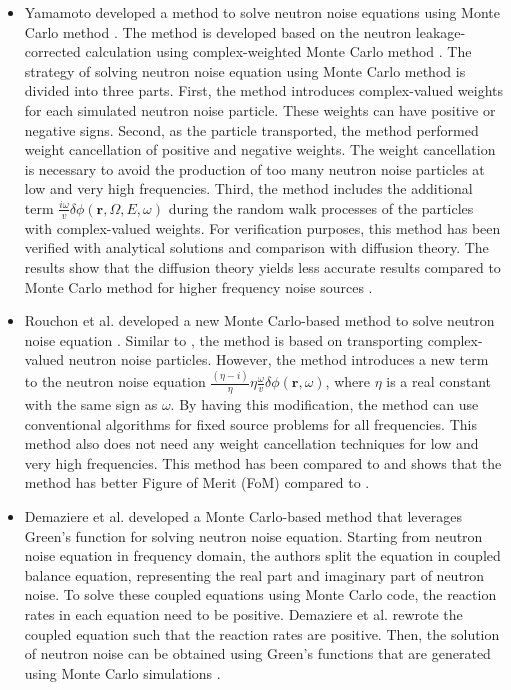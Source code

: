 \begin{itemize}
    \item Yamamoto developed a method to solve neutron noise equations using Monte Carlo method \cite{yamamotoMonteCarloMethod2013}. The method is developed based on the neutron leakage-corrected calculation using complex-weighted Monte Carlo method \cite{yamamotoMonteCarloMethod2012}. The strategy of solving neutron noise equation using Monte Carlo method is divided into three parts. First, the method introduces complex-valued weights for each simulated neutron noise particle. These weights can have positive or negative signs. Second, as the particle transported, the method performed weight cancellation of positive and negative weights. The weight cancellation is necessary to avoid the production of too many neutron noise particles at low and very high frequencies. Third, the method includes the additional term $\frac{i \omega}{v} \delta \phi(\textbf{r},\Omega, E, \omega)$ during the random walk processes of the particles with complex-valued weights. For verification purposes, this method has been verified with analytical solutions and comparison with diffusion theory. The results show that the diffusion theory yields less accurate results compared to Monte Carlo method for higher frequency noise sources \cite{yamamotoMonteCarloMethod2013}.
    \item Rouchon et al. developed a new Monte Carlo-based method to solve neutron noise equation \cite{rouchonNewMonteCarlo2017}. Similar to \cite{yamamotoMonteCarloMethod2013}, the method is based on transporting complex-valued neutron noise particles. However, the method introduces a new term to the neutron noise equation $\frac{(\eta - i)}{\eta} \eta \frac{\omega}{v} \delta \phi (\textbf{r}, \omega)$, where $\eta$ is a real constant with the same sign as $\omega$. By having this modification, the method can use conventional algorithms for fixed source problems for all frequencies. This method also does not need any weight cancellation techniques for low and very high frequencies. This method has been compared to \cite{yamamotoMonteCarloMethod2013} and shows that the method has better Figure of Merit (FoM) compared to \cite{yamamotoMonteCarloMethod2013}.
    \item Demaziere et al. developed a Monte Carlo-based method that leverages Green’s function for solving neutron noise equation. Starting from neutron noise equation in frequency domain, the authors split the equation in coupled balance equation, representing the real part and imaginary part of neutron noise. To solve these coupled equations using Monte Carlo code, the reaction rates in each equation need to be positive. Demaziere et al. rewrote the coupled equation such that the reaction rates are positive. Then, the solution of neutron noise can be obtained using Green’s functions that are generated using Monte Carlo simulations \cite{demaziereMonteCarlobasedDynamic29}.
\end{itemize}

